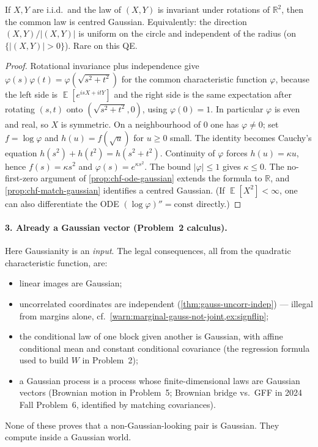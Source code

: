\documentclass[11pt,a4paper]{article}
\DeclareMathOperator{\E}{\mathbb{E}}
\begin{document}
\begin{proposition}[Maxwell]
\label{prop:maxwell}
If \( X,Y \) are i.i.d.\ and the law of \( (X,Y) \) is invariant under rotations of \( \mathbb{R}^{2} \), then the common law is centred Gaussian. Equivalently: the direction \( (X,Y)/|(X,Y)| \) is uniform on the circle and independent of the radius (on \( \{|(X,Y)|>0\} \)). Rare on this QE.
\end{proposition}

\begin{proof}
Rotational invariance plus independence give \( \varphi(s)\varphi(t)=\varphi(\sqrt{s^{2}+t^{2}}) \) for the common characteristic function \( \varphi \), because the left side is \( \E[e^{isX+itY}] \) and the right side is the same expectation after rotating \( (s,t) \) onto \( (\sqrt{s^{2}+t^{2}},0) \), using \( \varphi(0)=1 \). In particular \( \varphi \) is even and real, so \( X \) is symmetric. On a neighbourhood of \( 0 \) one has \( \varphi\neq 0 \); set \( f=\log\varphi \) and \( h(u)=f(\sqrt{u}) \) for \( u\ge 0 \) small. The identity becomes Cauchy's equation \( h(s^{2})+h(t^{2})=h(s^{2}+t^{2}) \). Continuity of \( \varphi \) forces \( h(u)=\kappa u \), hence \( f(s)=\kappa s^{2} \) and \( \varphi(s)=e^{\kappa s^{2}} \). The bound \( |\varphi|\le 1 \) gives \( \kappa\le 0 \). The no-first-zero argument of \cref{prop:chf-ode-gaussian} extends the formula to \( \mathbb{R} \), and \cref{prop:chf-match-gaussian} identifies a centred Gaussian. (If \( \E[X^{2}]<\infty \), one can also differentiate the ODE \( (\log\varphi)''=\mathrm{const} \) directly.)
\end{proof}

\paragraph{3. Already a Gaussian vector (Problem~2 calculus).}
Here Gaussianity is an \emph{input}. The legal consequences, all from the quadratic characteristic function, are:
\begin{itemize}
    \item
    linear images are Gaussian;
    \item
    uncorrelated coordinates are independent (\cref{thm:gauss-uncorr-indep}) --- illegal from margins alone, cf.\ \cref{warn:marginal-gauss-not-joint,ex:signflip};
    \item
    the conditional law of one block given another is Gaussian, with affine conditional mean and constant conditional covariance (the regression formula used to build \( W \) in Problem~2);
    \item
    a Gaussian process is a process whose finite-dimensional laws are Gaussian vectors (Brownian motion in Problem~5; Brownian bridge vs.\ GFF in 2024 Fall Problem~6, identified by matching covariances).
\end{itemize}
None of these proves that a non-Gaussian-looking pair is Gaussian. They compute inside a Gaussian world.
\end{document}
